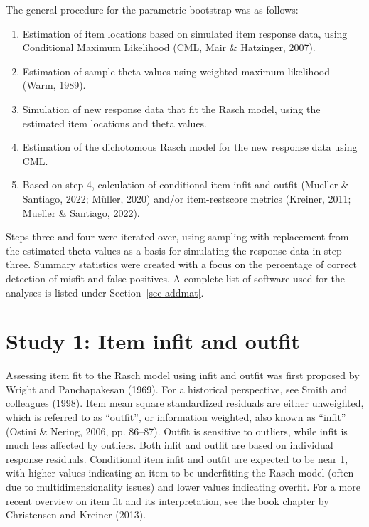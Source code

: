 \documentclass[
  letterpaper,
  DIV=11,
  numbers=noendperiod]{scrartcl}
\providecommand{\tightlist}{%
  \setlength{\itemsep}{0pt}\setlength{\parskip}{0pt}}\usepackage{longtable,booktabs,array}
\begin{document}
The general procedure for the parametric bootstrap was as follows:

\begin{enumerate}
\def\labelenumi{\arabic{enumi}.}
\tightlist
\item
  Estimation of item locations based on simulated item response data,
  using Conditional Maximum Likelihood (CML, Mair \& Hatzinger, 2007).
\item
  Estimation of sample theta values using weighted maximum likelihood
  (Warm, 1989).
\item
  Simulation of new response data that fit the Rasch model, using the
  estimated item locations and theta values.
\item
  Estimation of the dichotomous Rasch model for the new response data
  using CML.
\item
  Based on step 4, calculation of conditional item infit and outfit
  (Mueller \& Santiago, 2022; Müller, 2020) and/or item-restscore
  metrics (Kreiner, 2011; Mueller \& Santiago, 2022).
\end{enumerate}

Steps three and four were iterated over, using sampling with replacement
from the estimated theta values as a basis for simulating the response
data in step three. Summary statistics were created with a focus on the
percentage of correct detection of misfit and false positives. A
complete list of software used for the analyses is listed under
Section~\ref{sec-addmat}.

\section{Study 1: Item infit and
outfit}\label{study-1-item-infit-and-outfit}

Assessing item fit to the Rasch model using infit and outfit was first
proposed by Wright and Panchapakesan (1969). For a historical
perspective, see Smith and colleagues (1998). Item mean square
standardized residuals are either unweighted, which is referred to as
``outfit'', or information weighted, also known as ``infit'' (Ostini \&
Nering, 2006, pp. 86--87). Outfit is sensitive to outliers, while infit
is much less affected by outliers. Both infit and outfit are based on
individual response residuals. Conditional item infit and outfit are
expected to be near 1, with higher values indicating an item to be
underfitting the Rasch model (often due to multidimensionality issues)
and lower values indicating overfit. For a more recent overview on item
fit and its interpretation, see the book chapter by Christensen and
Kreiner (2013).
\end{document}
